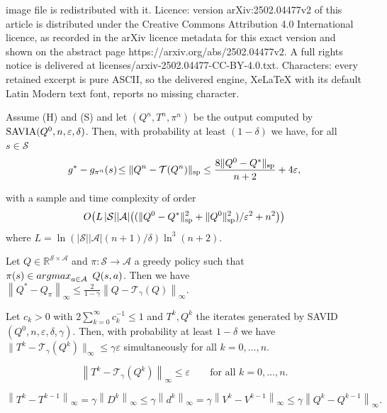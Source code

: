 \documentclass[10pt,a4paper]{amsart}
\newcommand{\Argmax}{\mathop{\rm argmax}}
\newcommand{\T}{\mathcal{T}}
\newcommand{\cA}{\mathcal{A}}
\newcommand{\cS}{\mathcal{S}}
\newcommand*{\infn}[1]{\left\|{#1}\right\|_{\infty}}
\newcommand{\reals}{\mathbb{R}}
\renewcommand{\sp}[1]{\|{#1}\|_\text{\rm sp}}
\begin{document}
image file is redistributed with it. Licence: version arXiv:2502.04477v2 of this article is distributed under the Creative Commons Attribution 4.0 International licence, as recorded in the arXiv licence metadata for this exact version and shown on the abstract page https://arxiv.org/abs/2502.04477v2. A full rights notice is delivered at licenses/arxiv-2502.04477-CC-BY-4.0.txt. Characters: every retained excerpt is pure ASCII, so the delivered engine, XeLaTeX with its default Latin Modern text font, reports no missing character.
\begin{theorem}\label{thm:err}
Assume \mbox{\sc (H)} and \mbox{\sc (S)} and let $(Q^n,T^n,\pi^n)$ be the output computed by $\mbox{\rm SAVIA}(Q^0,n,\varepsilon,\delta)$. Then, with probability at least $(1-\delta)$ we have, for all $s \in \cS$
\vspace{-1ex}
$$ g^*-g_{\pi^n}(s)\! \leq \sp{Q^n-\T(Q^n)}\leq \frac{8\sp{Q^0-Q^*}}{n+2}+4\varepsilon,$$

\vspace{-2ex}
with a sample and time complexity of order $${O}\big(L\,|\cS||\cA|\big(({\sp{Q^0-Q^*}^{2}+\sp{Q^0}^{2}})/{\varepsilon^{2}}+n^2\big)\big)$$ 
where  
$L=\ln(|\cS||\cA|(n+1)/\delta)\ln^3(n+2)$.
\end{theorem}

\begin{proposition} \label{prop:err-d}
    Let $Q\in\reals^{\cS\times\cA}$ and $\pi:\cS\to\cA$ a greedy policy such that $\pi(s)\in\Argmax_{a\in\cA}~Q(s,a)$. Then we have $ \infn{Q^*-Q_{\pi}}\leq \frac{2}{1-\gamma}\infn{Q-\T_\gamma(Q)}$.
\end{proposition}

\begin{proposition}\label{prop:sam-err0-d}
Let $c_k>0$  with \mbox{$2\sum_{k=0}^\infty c_k^{-1}\leq 1$} and $T^k, Q^k$ the iterates generated by \mbox{\rm SAVID}$(Q^0,n,\varepsilon,\delta, \gamma)$.
Then, with probability at least $1-\delta$ we have $\|T^k-\T_\gamma(Q^k)\|_\infty\le  \gamma \varepsilon$ simultaneously for 
 all $k=0,\ldots,n$.
\end{proposition}

\begin{equation}\label{Eq:Ek-d}
\infn{T^k-\T_\gamma(Q^{k})}\le \varepsilon\qquad \text{for all} \,\, k=0,\ldots,n.
\end{equation}

\begin{equation}\label{Eq:spk-d}\infn{T^k-T^{k-1}}=\gamma \infn{D^k} \le \gamma \infn{d^k}=\gamma \infn{V^k-V^{k-1}}\le \gamma \infn{Q^{k}-Q^{k-1}}.
\end{equation}
\end{document}
